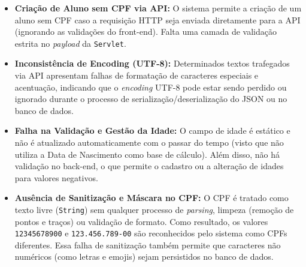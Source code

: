 \documentclass[12pt, a4paper]{article}
\begin{document}
\begin{itemize}
    \item \textbf{Criação de Aluno sem CPF via API:} O sistema permite a criação de um aluno sem CPF caso a requisição HTTP seja enviada diretamente para a API (ignorando as validações do front-end). Falta uma camada de validação estrita no \textit{payload} da \texttt{Servlet}.
    
    \item \textbf{Inconsistência de Encoding (UTF-8):} Determinados textos trafegados via API apresentam falhas de formatação de caracteres especiais e acentuação, indicando que o \textit{encoding} UTF-8 pode estar sendo perdido ou ignorado durante o processo de serialização/deserialização do JSON ou no banco de dados.
    
    \item \textbf{Falha na Validação e Gestão da Idade:} O campo de idade é estático e não é atualizado automaticamente com o passar do tempo (visto que não utiliza a Data de Nascimento como base de cálculo). Além disso, não há validação no back-end, o que permite o cadastro ou a alteração de idades para valores negativos.
    
    \item \textbf{Ausência de Sanitização e Máscara no CPF:} O CPF é tratado como texto livre (\texttt{String}) sem qualquer processo de \textit{parsing}, limpeza (remoção de pontos e traços) ou validação de formato. Como resultado, os valores \texttt{12345678900} e \texttt{123.456.789-00} são reconhecidos pelo sistema como CPFs diferentes. Essa falha de sanitização também permite que caracteres não numéricos (como letras e emojis) sejam persistidos no banco de dados.
\end{itemize}
\end{document}
